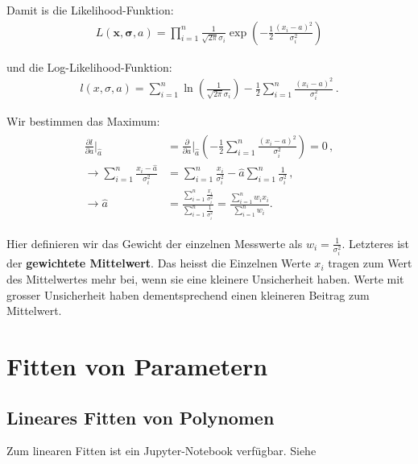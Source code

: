 Damit is die Likelihood-Funktion:
\begin{align}
L(\boldsymbol{x,\sigma}, a) = \prod_{i=1}^n \frac{1}{ \sqrt{2 \pi } \sigma_i} \exp \left( - \frac{1}{2} \frac{ (x_i - a)^2 }{ \sigma_i^2 } \right)
\label{eq:vl8-14}
\end{align}

und die Log-Likelihood-Funktion:
\begin{align}
l(x,\sigma, a) = \sum_{i=1}^n \ln \left( \frac{1}{ \sqrt{2 \pi } \sigma_i} \right) - \frac{1}{2} \sum_{i=1}^n \frac{ (x_i - a)^2 }{ \sigma_i^2 }\,.
\label{eq:vl8-15}
\end{align}

Wir bestimmen das Maximum:
\begin{align}
\begin{split}
\frac{ \partial l }{ \partial a } \bigg|_{\hat{a}} &= \frac{ \partial }{ \partial a } \bigg|_{\hat{a}} \left( - \frac{1}{2} \sum_{i=1}^n \frac{ (x_i - a)^2 }{ \sigma_i^2 } \right) = 0\,,\\
\rightarrow \sum_{i=1}^n \frac{ x_i - \hat{a} }{ \sigma_i^2 } &=  \sum_{i=1}^n \frac{ x_i }{ \sigma_i^2 } - \hat{a} \sum_{i=1}^n \frac{ 1 }{ \sigma_i^2 }\,,\\
\rightarrow \hat{a} &= \frac{ \sum_{i=1}^n \frac{ x_i }{ \sigma_i^2 } }{ \sum_{i=1}^n \frac{ 1 }{ \sigma_i^2 } } =\frac{ \sum_{i=1}^n w_i x_i }{ \sum_{i=1}^n w_i \,}.
\label{eq:vl8-16}
\end{split}
\end{align}

Hier definieren wir das Gewicht der einzelnen Messwerte als $w_i = \frac{1}{\sigma_i^2}$. 
Letzteres ist der \textbf{gewichtete Mittelwert}. Das heisst die Einzelnen Werte $x_i$ tragen zum Wert des Mittelwertes mehr bei, wenn sie eine kleinere Unsicherheit haben. Werte mit grosser Unsicherheit haben dementsprechend einen kleineren Beitrag zum Mittelwert.



\chapter{Fitten von Parametern}
 
\section{Lineares Fitten von Polynomen}
\begin{center}
\begin{tcolorbox}[enhanced,width=6in,center upper,
    fontupper=\large,drop fuzzy shadow southwest,
    colframe=blue!50!black,colback=blue!10]
    {Zum linearen Fitten ist ein Jupyter-Notebook verfügbar. Siehe  }
\end{tcolorbox}
\end{center}

